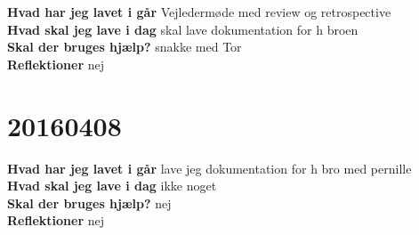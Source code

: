 \documentclass{article}
\begin{document}
						\textbf{Hvad har jeg lavet i går}
						Vejledermøde med review og retrospective
						\\
						\textbf{Hvad skal jeg lave i dag}
						skal lave dokumentation for h broen
						\\
						\textbf{Skal der bruges hjælp?}
						snakke med Tor
						\\
						\textbf{Reflektioner}
						nej	
						
	\section{20160408}
	
	\textbf{Hvad har jeg lavet i går}
	lave jeg dokumentation for h bro med pernille
	\\
	\textbf{Hvad skal jeg lave i dag}
	ikke noget
	\\
	\textbf{Skal der bruges hjælp?}
	nej
	\\
	\textbf{Reflektioner}
	nej	
						
\end{document}
